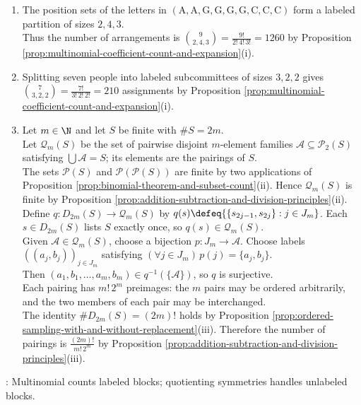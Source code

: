 \begin{example} \label{ex:multinomial-arrangements-and-pairings} 
\begin{enumerate}[label=(\roman*)]
\setlength{\itemsep}{0pt}
\item The position sets of the letters in $(\mathrm{A},\mathrm{A},\mathrm{G},\mathrm{G},\mathrm{G},\mathrm{G},\mathrm{C},\mathrm{C},\mathrm{C})$ form a labeled partition of sizes $2,4,3$.\\
Thus the number of arrangements is $\binom{9}{2,4,3}=\frac{9!}{2!\,4!\,3!}=1260$ by Proposition \ref{prop:multinomial-coefficient-count-and-expansion}(i).
\item Splitting seven people into labeled subcommittees of sizes $3,2,2$ gives $\binom{7}{3,2,2}=\frac{7!}{3!\,2!\,2!}=210$ assignments by Proposition \ref{prop:multinomial-coefficient-count-and-expansion}(i).
\item Let $m\in\N$ and let $S$ be finite with $\#S=2m$.\\
Let $\mathcal{Q}_m(S)$ be the set of pairwise disjoint $m$-element families $\mathcal{A}\subseteq\mathcal{P}_2(S)$ satisfying $\bigcup\mathcal{A}=S$; its elements are the pairings of $S$.\\
The sets $\mathcal{P}(S)$ and $\mathcal{P}(\mathcal{P}(S))$ are finite by two applications of Proposition \ref{prop:binomial-theorem-and-subset-count}(ii). Hence $\mathcal{Q}_m(S)$ is finite by Proposition \ref{prop:addition-subtraction-and-division-principles}(ii).\\
Define $q:D_{2m}(S)\to\mathcal{Q}_m(S)$ by $q(s)\defeq\{\{s_{2j-1},s_{2j}\}:j\in J_m\}$. Each $s\in D_{2m}(S)$ lists $S$ exactly once, so $q(s)\in\mathcal{Q}_m(S)$.\\
Given $\mathcal{A}\in\mathcal{Q}_m(S)$, choose a bijection $p:J_m\to\mathcal{A}$. Choose labels $((a_j,b_j))_{j\in J_m}$ satisfying $(\forall j\in J_m)\,p(j)=\{a_j,b_j\}$.\\
Then $(a_1,b_1,\ldots,a_m,b_m)\in q^{-1}(\{\mathcal{A}\})$, so $q$ is surjective.\\
Each pairing has $m!\,2^m$ preimages: the $m$ pairs may be ordered arbitrarily, and the two members of each pair may be interchanged.\\
The identity $\#D_{2m}(S)=(2m)!$ holds by Proposition \ref{prop:ordered-sampling-with-and-without-replacement}(iii). Therefore the number of pairings is $\frac{(2m)!}{m!\,2^m}$ by Proposition \ref{prop:addition-subtraction-and-division-principles}(iii).
\end{enumerate}
: Multinomial counts labeled blocks; quotienting symmetries handles unlabeled blocks.
\end{example}
